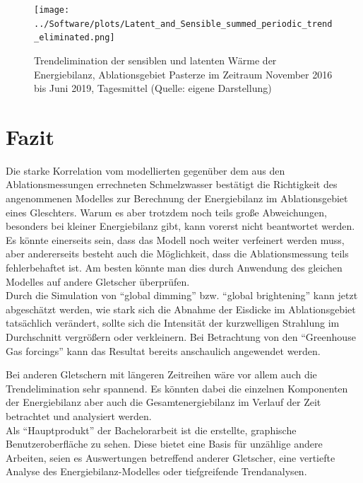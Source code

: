 \documentclass[11pt,a4paper]{article}
\begin{document}
\begin{figure}[H]
\centering
\texttt{[image: ../Software/plots/Latent\_and\_Sensible\_summed\_periodic\_trend\_eliminated.png]}
\caption[Trendelimination der sensiblen und latenten Wärme der Energiebilanz, Ablationsgebiet Pasterze im Zeitraum November 2016 bis Juni 2019, Tagesmittel]{Trendelimination der sensiblen und latenten Wärme der Energiebilanz, Ablationsgebiet Pasterze im Zeitraum November 2016 bis Juni 2019, Tagesmittel (Quelle: eigene Darstellung)}
\label{fig:Trendelimination der sensiblen und latenten Wärme der Energiebilanz}
\end{figure}


\pagebreak
\section{Fazit}
Die starke Korrelation vom modellierten gegenüber dem aus den Ablationsmessungen errechneten Schmelzwasser bestätigt die Richtigkeit des angenommenen Modelles zur Berechnung der Energiebilanz im Ablationsgebiet eines Gleschters. Warum es aber trotzdem noch teils große Abweichungen, besonders bei kleiner Energiebilanz gibt, kann vorerst nicht beantwortet werden. Es könnte einerseits sein, dass das Modell noch weiter verfeinert werden muss, aber andererseits besteht auch die Möglichkeit, dass die Ablationsmessung teils fehlerbehaftet ist. Am besten könnte man dies durch Anwendung des gleichen Modelles auf andere Gletscher überprüfen.\\

Durch die Simulation von ``global dimming'' bzw. ``global brightening'' kann jetzt abgeschätzt werden, wie stark sich die Abnahme der Eisdicke im Ablationsgebiet tatsächlich verändert, sollte sich die Intensität der kurzwelligen Strahlung im Durchschnitt vergrößern oder verkleinern. Bei Betrachtung von den ``Greenhouse Gas forcings'' kann das Resultat bereits anschaulich angewendet werden.

Bei anderen Gletschern mit längeren Zeitreihen wäre vor allem auch die Trendelimination sehr spannend. Es könnten dabei die einzelnen Komponenten der Energiebilanz aber auch die Gesamtenergiebilanz im Verlauf der Zeit betrachtet und analysiert werden.\\

Als ``Hauptprodukt'' der Bachelorarbeit ist die erstellte, graphische Benutzeroberfläche zu sehen. Diese bietet eine Basis für unzählige andere Arbeiten, seien es Auswertungen betreffend anderer Gletscher, eine vertiefte Analyse des Energiebilanz-Modelles oder tiefgreifende Trendanalysen.  
\end{document}
